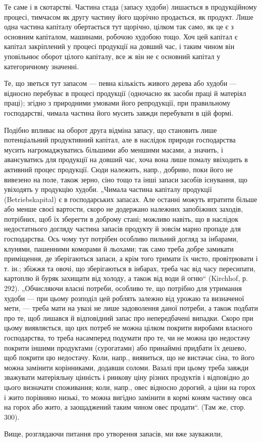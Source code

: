 
Те саме і в скотарстві. Частина стада (запасу худоби) лишається в продукційному процесі, тимчасом як
другу частину його щорічно продається, як продукт. Лише одна частина капіталу обертається тут
щорічно, цілком так само, як це є з основним капіталом, машинами, робочою худобою тощо. Хоч цей
капітал є капітал закріплений у процесі продукції на довший час, і таким чином він уповільнює оборот
цілого капіталу, все ж він не є основний капітал у категоричному значенні.

Те, що зветься тут запасом — певна кількість живого дерева або худоби — відносно перебуває в процесі
продукції (одночасно як засоби праці й матеріял праці); згідно з природними умовами його
репродукції, при правильному господарстві, чимала частина його мусить завжди перебувати в цій формі.

Подібно впливає на оборот друга відміна запасу, що становить лише потенціальний продуктивний
капітал, але в наслідок природи господарства мусить нагромаджуватись більшими або меншими масами, а
значить, і авансуватись для продукції на довший час, хоча вона лише помалу ввіходить в активний
процес продукції. Сюди належить, напр., добриво, поки його не вивезено на поле, також зерно, сіно
тощо та інші запаси засобів існування, що увіходять у продукцію худоби. „Чимала частина капіталу
продукції (Betriebskapital) є в господарських запасах. Але останні можуть втратити більше або менше
своєї вартости, скоро не додержано належних запобіжних заходів, потрібних, щоб їх зберегти в доброму
стані; можливо навіть, що в наслідок недостатнього догляду частина запасів продукту й зовсім марно
пропаде для господарства. Ось чому тут потрібен особливо пильний догляд за інбарами, клунями,
пашенними коморами й льохами; так само треба добре замикати приміщення, де зберігаються запаси, а
крім того тримати їх чисто, провітрювати і т. ін.; збіжжя та овочі, що зберігаються в інбарах, треба
час від часу пересипати, картоплю й буряк захищати від холоду, а також від води й огню“ (Kirchhof,
р. 292). „Обчисляючи власні потреби, особливо те, що потрібно для утримання худоби — при цьому
розподіл цей роблять залежно від урожаю та визначеної мети, — треба мати на увазі не лише
задоволення даної потреби, а також подбати про те, щоб лишався й відповідний запас про непередбачені
випадки. Скоро при цьому виявляється, що цих потреб не можна цілком покрити виробами власного
господарства, то треба насамперед подумати про те, чи не можна цю недостачу покрити іншими
продуктами (сурогатами) або принаймні придбати їх дешево, щоб покрити цю недостачу. Коли, напр.,
виявиться, що не вистачає сіна, то його можна замінити корінниками, додавши соломи. Вазалі при цьому
треба завжди зважувати матеріяльну цінність і ринкову ціну різних продуктів і відповідно до цього
визначати споживання; коли, напр., овес відносно дорогий, а ціни на горох і жито порівняно низькі,
то можна вигідно замінити в кормі коням частину овса на горох або жито, а заощаджений таким чином
овес продати“. (Там же, стор. 300).

Вище, розглядаючи питання про утворення запасів, ми вже зауважили,
\parbreak{}  %
